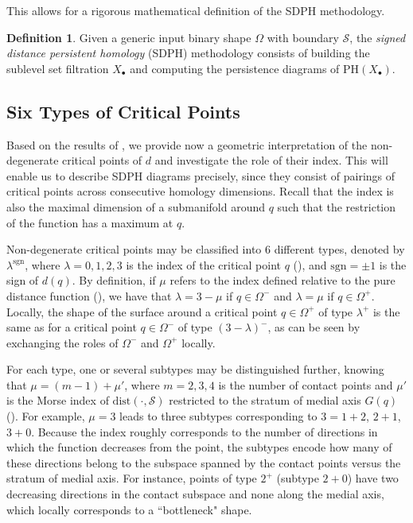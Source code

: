 \documentclass[11pt]{article}
\newcommand{\PH}{\mathrm{PH}}
\newcommand{\sgn}{\mathrm{sgn}}
\newcommand{\W}{\Omega}
\newcommand{\Xb}{X_\bullet}
\newcommand{\dist}{\mathrm{dist}}
\newcommand{\Surf}{\mathcal{S}}
\theoremstyle{plain}
\theoremstyle{definition}
\newtheorem{defi}{Definition}
\theoremstyle{remark}
\begin{document}
This allows for a rigorous mathematical definition of the SDPH methodology.
\begin{defi}
	Given a generic input binary shape $\W$ with boundary $\Surf$, the \emph{signed distance persistent homology} (SDPH) methodology consists of building the sublevel set filtration $\Xb$ and computing the persistence diagrams of $\PH(\Xb)$.
\end{defi}

\subsection{Six Types of Critical Points}
\label{sec:6_types_crit_pts}

Based on the results of , we provide now a geometric interpretation of the non-degenerate critical points of $d$ and investigate the role of their index. This will enable us to describe SDPH diagrams precisely, since they consist of pairings of critical points across consecutive homology dimensions. Recall that the index is also the maximal dimension of a submanifold around $q$ such that the restriction of the function has a maximum at $q$.

Non-degenerate critical points may be classified into $6$ different types, denoted by $\lambda^\sgn$, where $\lambda = 0,1,2,3$ is the index of the critical point $q$ (), and $\sgn = \pm 1$ is the sign of $d(q)$.
By definition, if $\mu$ refers to the index defined relative  to the pure distance function (), we have that $\lambda = 3 - \mu$ if $q \in \W^-$ and $\lambda = \mu$ if $q \in \W^+$. 
Locally, the shape of the surface around a critical point $q \in \W^+$ of type $\lambda^+$ is the same as for a critical point $q \in \W^-$ of type $(3-\lambda)^-$, as can be seen by exchanging the roles of $\W^-$ and $\W^+$ locally.

For each type, one or several subtypes may be distinguished further, knowing that $\mu = (m - 1) + \mu'$, where $m = 2,3,4$ is the number of contact points and $\mu'$ is the Morse index of $\dist(\cdot, \Surf)$ restricted to the stratum of medial axis $G(q)$ (). For example, $\mu = 3$ leads to three subtypes corresponding to $3 = 1 + 2$, $2 + 1$, $3 + 0$. Because the index roughly corresponds to the number of directions in which the function decreases from the point, the subtypes encode how many of these directions belong to the subspace spanned by the contact points versus the stratum of medial axis. For instance, points of type $2^+$ (subtype $2 + 0$) have two decreasing directions in the contact subspace and none along the medial axis, which locally corresponds to a ``bottleneck" shape.
\end{document}
